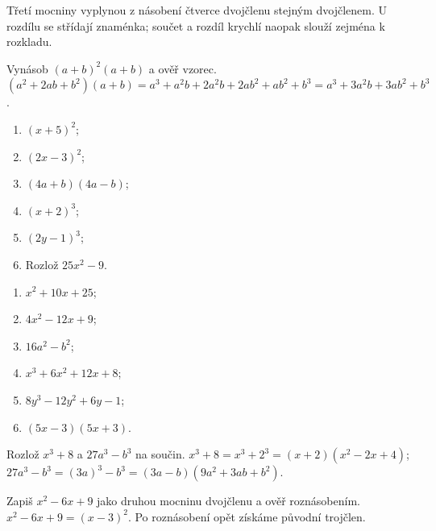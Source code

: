 \documentclass[11pt,a4paper]{article}
\begin{document}
Třetí mocniny vyplynou z násobení čtverce dvojčlenu stejným dvojčlenem. U rozdílu se střídají znaménka; součet a rozdíl krychlí naopak slouží zejména k rozkladu.
\begin{prikladReseniBox}[title={Příklad 3}]
Vynásob $(a+b)^2(a+b)$ a ověř vzorec.
\tcblower
$(a^2+2ab+b^2)(a+b)=a^3+a^2b+2a^2b+2ab^2+ab^2+b^3=a^3+3a^2b+3ab^2+b^3$.
\end{prikladReseniBox}
\begin{zadaniReseniBox}[title={Samostatná práce 1}]
\begin{enumerate}[label=\alph*)]
\item $(x+5)^2$;
\item $(2x-3)^2$;
\item $(4a+b)(4a-b)$;
\item $(x+2)^3$;
\item $(2y-1)^3$;
\item Rozlož $25x^2-9$.
\end{enumerate}
\tcblower
\begin{enumerate}[label=\alph*)]
\item $x^2+10x+25$;
\item $4x^2-12x+9$;
\item $16a^2-b^2$;
\item $x^3+6x^2+12x+8$;
\item $8y^3-12y^2+6y-1$;
\item $(5x-3)(5x+3)$.
\end{enumerate}
\end{zadaniReseniBox}
\begin{prikladReseniBox}[title={Příklad 4}]
Rozlož $x^3+8$ a $27a^3-b^3$ na součin.
\tcblower
$x^3+8=x^3+2^3=(x+2)(x^2-2x+4)$;\\
$27a^3-b^3=(3a)^3-b^3=(3a-b)(9a^2+3ab+b^2)$.
\end{prikladReseniBox}
\begin{zadaniReseniBox}[title={Rozšíření 1}]
Zapiš $x^2-6x+9$ jako druhou mocninu dvojčlenu a ověř roznásobením.
\tcblower
$x^2-6x+9=(x-3)^2$. Po roznásobení opět získáme původní trojčlen.
\end{zadaniReseniBox}
\end{document}
